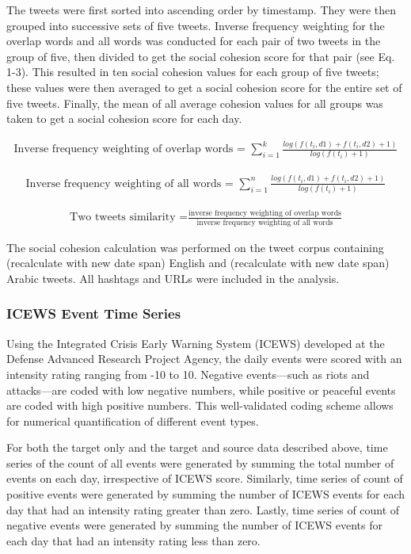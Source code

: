 \documentclass[english,man]{apa6}
\begin{document}
The tweets were first sorted into ascending order by timestamp. They were
then grouped into successive sets of five tweets. Inverse frequency
weighting for the overlap words and all words was conducted for each pair
of two tweets in the group of five, then divided to get the social cohesion
score for that pair (see Eq. 1-3). This resulted in ten social cohesion
values for each group of five tweets; these values were then averaged to get
a social cohesion score for the entire set of five tweets. Finally,
the mean of all average cohesion values for all groups was taken to get
a social cohesion score for each day.

\begin{align}
\text{Inverse frequency weighting of overlap words = }\sum_{i=1}^k \frac{log(f(t_i, d1) + f(t_i, d2) + 1)}{log(f(t_i) + 1)}
\end{align}

\begin{align}
\text{Inverse frequency weighting of all words = }\sum_{i=1}^n \frac{log(f(t_i, d1) + f(t_i, d2) + 1)}{log(f(t_i) + 1)}
\end{align}

\begin{align}
\text{Two tweets similarity =}\frac{\text{inverse frequency weighting of overlap words}}{\text{inverse frequency weighting of all words}}
\end{align}

The social cohesion calculation was performed on the tweet corpus
containing (recalculate with new date span) English and (recalculate with
new date span) Arabic tweets. All hashtags and URLs were included in the
analysis.

\hypertarget{icews-event-time-series}{%
\subsubsection{ICEWS Event Time Series}\label{icews-event-time-series}}

Using the Integrated Crisis Early Warning System (ICEWS) developed at the
Defense Advanced Research Project Agency, the daily events were
scored with an intensity rating ranging from -10 to 10. Negative
events---such as riots and attacks---are coded with low negative numbers, while
positive or peaceful events are coded with high positive numbers. This
well-validated coding scheme allows for numerical quantification of
different event types.

For both the target only and the target and source data described above, time series of
the count of all events were generated by summing the total number of events
on each day, irrespective of ICEWS score. Similarly, time series of count
of positive events were generated by summing the number of ICEWS events
for each day that had an intensity rating greater than zero. Lastly,
time series of count of negative events were generated by summing the number
of ICEWS events for each day that had an intensity rating less than zero.
\end{document}
